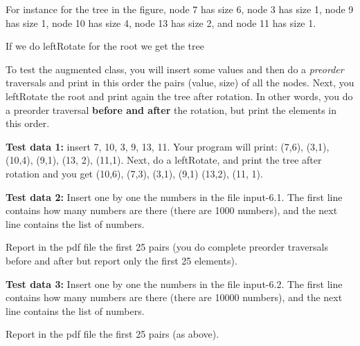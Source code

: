 \documentclass[11pt]{article}
\begin{document}

For instance for the tree in the figure,  node 7 has size 6, node 3 has size 1, node 9 has size 1, node 10 has size 4, node 13 has size 2, and node 11 has size 1.

If we do \textsf{leftRotate} for the root we get the tree


To test the augmented class, you will insert some values and then do a \emph{preorder} traversals and print in this order  the pairs (value, size) of all the nodes. 	Next, you \textsf{leftRotate} the root and print again the tree after rotation. In other words, you do a preorder traversal \textbf{before and after} the rotation, but print the elements in this order.

\textbf{Test data 1:} insert 7, 10, 3, 9, 13, 11. Your program will print: (7,6), (3,1), (10,4), (9,1), (13, 2), (11,1).
Next, do a \textsf{leftRotate}, and print the tree after rotation and you get (10,6), (7,3), (3,1), (9,1) (13,2), (11, 1).




\textbf{Test data 2:}  Insert one by one the numbers in the file input-6.1. The first line contains how many numbers are there (there are 1000 numbers), and the next line contains the list of numbers.

Report in the pdf file the first 25 pairs (you do complete preorder traversals before and after but report only the first 25 elements).

\textbf{Test data 3:} Insert one by one the numbers in the file input-6.2. The first line contains how many numbers are there (there are 10000 numbers), and the next line contains the list of numbers.

Report in the pdf file the first 25 pairs (as above).
\end{document}
